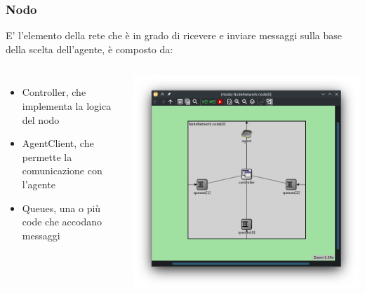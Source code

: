 \documentclass[compress]{beamer}
\begin{document}
\subsubsection{Nodo}
\begin{frame}{\subsubsecname}
    E' l'elemento della rete che è in grado di ricevere e inviare messaggi sulla base della scelta dell'agente, è composto da:
    \begin{columns}
            \begin{minipage}[b]{1\textwidth}
                \begin{itemize}
                    \item Controller, che implementa la logica del nodo
                    \item AgentClient, che permette la comunicazione con l'agente
                    \item Queues, una o più code che accodano messaggi
                \end{itemize}
            \end{minipage}
            \begin{minipage}{1\textwidth}
                \begin{adjustbox}{margin=0cm 0cm 0.1cm 0.2cm, center} %
                    \includegraphics[width=1\textwidth]{figs/node_layout_3queues.png}
                \end{adjustbox}
            \end{minipage}
    \end{columns}
\end{frame}
\end{document}
